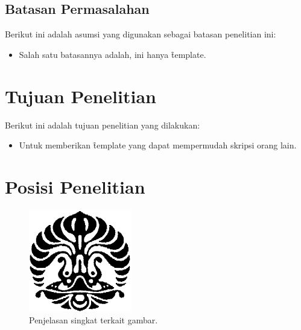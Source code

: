 \subsection{Batasan Permasalahan}
\label{sec:batasanMasalah}
Berikut ini adalah asumsi yang digunakan sebagai batasan penelitian ini:
\begin{itemize}
	\item Salah satu batasannya adalah, ini hanya \f{template}.
\end{itemize}

\noindent{}


\section{Tujuan Penelitian}
\label{sec:tujuan}
Berikut ini adalah tujuan penelitian yang dilakukan:
\begin{itemize}
	\item Untuk memberikan \f{template} yang dapat mempermudah skripsi orang lain.
\end{itemize}

\noindent{}


\section{Posisi Penelitian}
\label{sec:posisiPenelitian}

\begin{figure}
	\centering
	\includegraphics[width=0.4\textwidth]{assets/pics/makara.png}
	\caption{Penjelasan singkat terkait gambar.}
	\label{fig:research_position}
\end{figure}

